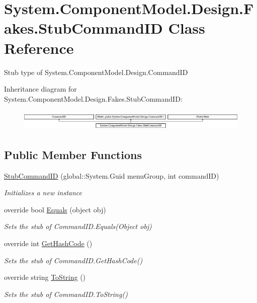 \hypertarget{class_system_1_1_component_model_1_1_design_1_1_fakes_1_1_stub_command_i_d}{\section{System.\-Component\-Model.\-Design.\-Fakes.\-Stub\-Command\-I\-D Class Reference}
\label{class_system_1_1_component_model_1_1_design_1_1_fakes_1_1_stub_command_i_d}
}


Stub type of System.\-Component\-Model.\-Design.\-Command\-I\-D 


Inheritance diagram for System.\-Component\-Model.\-Design.\-Fakes.\-Stub\-Command\-I\-D\-:\begin{figure}[H]
\begin{center}
\leavevmode
\includegraphics[height=1.020036cm]{class_system_1_1_component_model_1_1_design_1_1_fakes_1_1_stub_command_i_d}
\end{center}
\end{figure}
\subsection*{Public Member Functions}
\begin{DoxyCompactItemize}
\item 
\hyperlink{class_system_1_1_component_model_1_1_design_1_1_fakes_1_1_stub_command_i_d_a97c74f4926c4bd255c47587b79d0b90f}{Stub\-Command\-I\-D} (global\-::\-System.\-Guid menu\-Group, int command\-I\-D)
\begin{DoxyCompactList}\small\item\em Initializes a new instance\end{DoxyCompactList}\item 
override bool \hyperlink{class_system_1_1_component_model_1_1_design_1_1_fakes_1_1_stub_command_i_d_afb6141789158c6a30cf1fe9c3042911f}{Equals} (object obj)
\begin{DoxyCompactList}\small\item\em Sets the stub of Command\-I\-D.\-Equals(\-Object obj)\end{DoxyCompactList}\item 
override int \hyperlink{class_system_1_1_component_model_1_1_design_1_1_fakes_1_1_stub_command_i_d_a43e43bb122053ded81abbb82cab84ecf}{Get\-Hash\-Code} ()
\begin{DoxyCompactList}\small\item\em Sets the stub of Command\-I\-D.\-Get\-Hash\-Code()\end{DoxyCompactList}\item 
override string \hyperlink{class_system_1_1_component_model_1_1_design_1_1_fakes_1_1_stub_command_i_d_ad36613e34c7f466cef57441ee3b5feed}{To\-String} ()
\begin{DoxyCompactList}\small\item\em Sets the stub of Command\-I\-D.\-To\-String()\end{DoxyCompactList}\end{DoxyCompactItemize}
